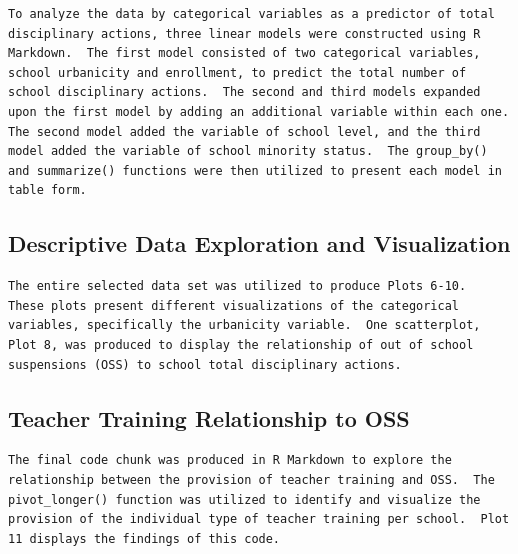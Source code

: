 \documentclass[man]{apa6}
\begin{document}
\begin{verbatim}
To analyze the data by categorical variables as a predictor of total disciplinary actions, three linear models were constructed using R Markdown.  The first model consisted of two categorical variables, school urbanicity and enrollment, to predict the total number of school disciplinary actions.  The second and third models expanded upon the first model by adding an additional variable within each one.  The second model added the variable of school level, and the third model added the variable of school minority status.  The group_by() and summarize() functions were then utilized to present each model in table form. 
\end{verbatim}

\hypertarget{descriptive-data-exploration-and-visualization}{%
\subsection{Descriptive Data Exploration and Visualization}\label{descriptive-data-exploration-and-visualization}}

\begin{verbatim}
The entire selected data set was utilized to produce Plots 6-10.  These plots present different visualizations of the categorical variables, specifically the urbanicity variable.  One scatterplot, Plot 8, was produced to display the relationship of out of school suspensions (OSS) to school total disciplinary actions. 
\end{verbatim}

\hypertarget{teacher-training-relationship-to-oss}{%
\subsection{Teacher Training Relationship to OSS}\label{teacher-training-relationship-to-oss}}

\begin{verbatim}
The final code chunk was produced in R Markdown to explore the relationship between the provision of teacher training and OSS.  The pivot_longer() function was utilized to identify and visualize the provision of the individual type of teacher training per school.  Plot 11 displays the findings of this code. 
\end{verbatim}
\end{document}

